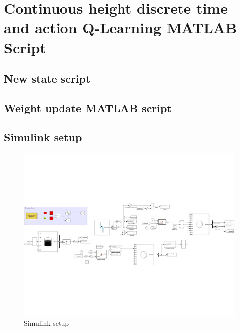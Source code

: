 \chapter{Continuous height discrete time and action Q-Learning MATLAB Script} 

\section{New state script}



\clearpage \newpage
\section{Weight update MATLAB script}



\clearpage \newpage
\section{Simulink setup}\label{app:Simulink}
\begin{figure}[h!]
	\centering
	\includegraphics[width=1\linewidth]{figures/Simulink.pdf}
	\caption{Simulink setup}
	\label{fig:Simulink}
\end{figure} 